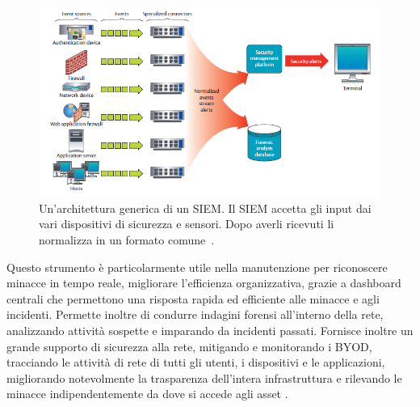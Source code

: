         \begin{figure}[H]
            \centering
            \includegraphics[width=1.0\textwidth]{Immagini/siem_paper_image.PNG}
            \caption{Un'architettura generica di un SIEM. Il SIEM accetta gli input dai vari dispositivi di sicurezza e sensori. Dopo averli ricevuti li normalizza in un formato comune~\cite{siem_and_soc_paper}.}
            \label{fig:siem_paper_image}
        \end{figure}
    
        Questo strumento è particolarmente utile nella manutenzione per riconoscere minacce in tempo reale, migliorare l'efficienza organizzativa, grazie a dashboard centrali che permettono una risposta rapida ed efficiente alle minacce e agli incidenti. Permette inoltre di condurre indagini forensi all'interno della rete, analizzando attività sospette e imparando da incidenti passati. Fornisce inoltre un grande supporto di sicurezza alla rete, mitigando e monitorando i BYOD, tracciando le attività di rete di tutti gli utenti, i dispositivi e le applicazioni, migliorando notevolmente la trasparenza dell'intera infrastruttura e rilevando le minacce indipendentemente da dove si accede agli asset \cite{siem_and_soc_paper}.

